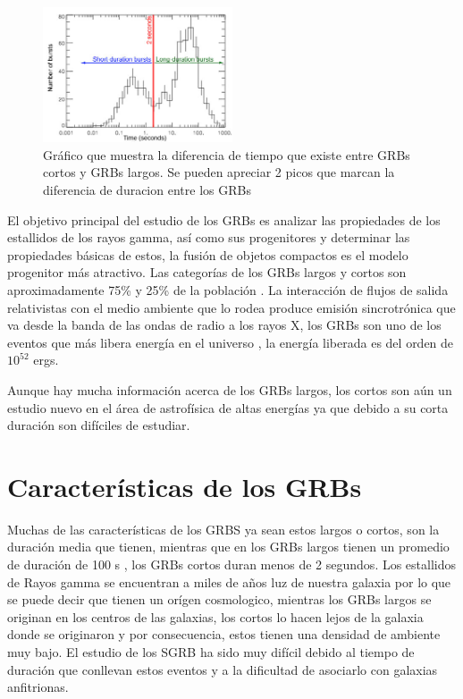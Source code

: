 \documentclass[12pt,a4paper]{book}
\begin{document}
\begin{figure} 
  \centering
    \includegraphics[width=0.5\textwidth]{Figuras/burst_durations_labelled.jpg}
  \caption{Gráfico que muestra la diferencia de tiempo que existe entre GRBs cortos y GRBs largos. Se pueden apreciar 2 picos que marcan la diferencia de duracion entre los GRBs}
  \label{fig:Batse_duration_GRBs}
\end{figure}

El objetivo principal del estudio de los GRBs es analizar las propiedades de los estallidos de los rayos gamma, así como sus progenitores y determinar las propiedades básicas de estos, la fusión de objetos compactos es el modelo progenitor más atractivo.
Las categorías de los GRBs largos y cortos son aproximadamente 75\% y 25\% de la población \cite{GRB:PPP}. %
La interacción de flujos de salida relativistas con el medio ambiente que lo rodea produce emisión sincrotrónica que va desde la banda de las ondas de radio a los rayos X, los GRBs son uno de los eventos que más libera energía en el universo \cite{Berger:2013jza}, la energía liberada es del orden de $10^{52}$ ergs.

Aunque hay mucha información acerca de los GRBs largos, los cortos son aún un estudio nuevo en el área de astrofísica de altas energías ya que debido a su corta duración son difíciles de estudiar. 
\section{Características de los GRBs}
Muchas de las características de los GRBS ya sean estos largos o cortos, son la duración media que tienen, mientras que en los GRBs largos tienen un promedio de duración de 100 s \cite{PGRB-piran}, los GRBs cortos duran menos de 2 segundos. Los estallidos de Rayos gamma se encuentran a miles de años luz de nuestra galaxia por lo que se puede decir que tienen un orígen cosmologico, mientras los GRBs largos se originan en los centros de las galaxias, los cortos lo hacen lejos de la galaxia donde se originaron y por consecuencia, estos tienen una densidad de ambiente muy bajo. El estudio de los SGRB ha sido muy difícil debido al tiempo de duración que conllevan estos eventos y a la dificultad de asociarlo con galaxias anfitrionas. 
\end{document}
